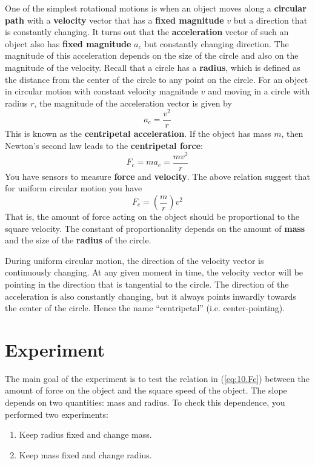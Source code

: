 One of the simplest rotational motions is when an object moves along a \textbf{circular path} with a \textbf{velocity} vector that has a \textbf{fixed magnitude} $v$ but a direction that is constantly changing. It turns out that the \textbf{acceleration} vector of such an object also has \textbf{fixed magnitude} $a_{c}$ but constantly changing direction. The magnitude of this acceleration depends on the size of the circle and also on the magnitude of the velocity. Recall that a circle has a \textbf{radius}, which is defined as the distance from the center of the circle to any point on the circle. For an object in circular motion with constant velocity magnitude $v$ and moving in a circle with radius $r$, the magnitude of the acceleration vector is given by
\begin{equation}
    a_{c} = \frac{v^{2}}{r}
\end{equation}
This is known as the \textbf{centripetal acceleration}. If the object has mass $m$, then Newton's second law leads to the \textbf{centripetal force}:
\begin{equation}
    F_{c} = m a_{c} = \frac{m v^{2}}{r}
\end{equation}
You have sensors to measure \textbf{force} and \textbf{velocity}. The above relation suggest that for uniform circular motion you have
\begin{equation}
    F_{c} = \left(\frac{m}{r}\right) v^{2}
    \label{eq:10.Fc}
\end{equation}
That is, the amount of force acting on the object should be proportional to the square velocity. The constant of proportionality depends on the amount of \textbf{mass} and the size of the \textbf{radius} of the circle.

During uniform circular motion, the direction of the velocity vector is continuously changing. At any given moment in time, the velocity vector will be pointing in the direction that is tangential to the circle. The direction of the acceleration is also constantly changing, but it always points inwardly towards the center of the circle. Hence the name ``centripetal'' (i.e. center-pointing).
\section{Experiment}
The main goal of the experiment is to test the relation in (\ref{eq:10.Fc}) between the amount of force on the object and the square speed of the object. The slope depends on two quantities: mass and radius. To check this dependence, you performed two experiments:
\begin{enumerate}
    \item Keep radius fixed and change mass.
    \item Keep mass fixed and change radius.
\end{enumerate}
